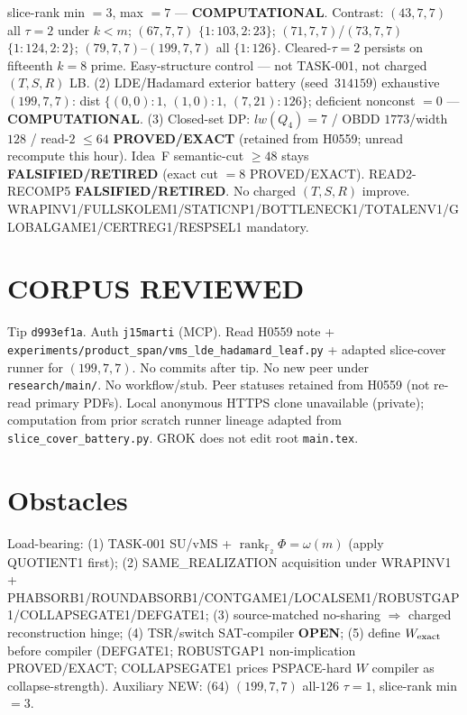 \documentclass[11pt]{article}
\begin{document}
slice-rank min $=3$, max $=7$ --- \textbf{COMPUTATIONAL}.
Contrast: $(43,7,7)$ all $\tau{=}2$ under $k{<}m$; $(67,7,7)$ $\{1{:}103,2{:}23\}$;
$(71,7,7)$/$(73,7,7)$ $\{1{:}124,2{:}2\}$; $(79,7,7)$--$(199,7,7)$ all $\{1{:}126\}$.
Cleared-$\tau{=}2$ persists on fifteenth $k{=}8$ prime. Easy-structure control --- not TASK-001,
not charged $(T,S,R)$ LB.
(2) LDE/Hadamard exterior battery (seed~$314159$) exhaustive $(199,7,7)$:
dist $\{(0,0){:}1,\,(1,0){:}1,\,(7,21){:}126\}$; deficient nonconst $=0$ --- \textbf{COMPUTATIONAL}.
(3) Closed-set DP: $lw(Q_4)=7$ / OBDD $1773$/width $128$ / read-$2$ $\le64$
\textbf{PROVED/EXACT} (retained from H0559; unread recompute this hour).
Idea~F semantic-cut $\ge48$ stays \textbf{FALSIFIED/RETIRED} (exact cut $=8$ PROVED/EXACT).
READ2-RECOMP5 \textbf{FALSIFIED/RETIRED}. No charged $(T,S,R)$ improve.
WRAPINV1/FULLSKOLEM1/STATICNP1/BOTTLENECK1/TOTALENV1/GLOBALGAME1/CERTREG1/RESPSEL1 mandatory.

\section*{CORPUS REVIEWED}
Tip \texttt{d993ef1a}. Auth \texttt{j15marti} (MCP). Read H0559 note +
\texttt{experiments/product\_span/vms\_lde\_hadamard\_leaf.py} + adapted slice-cover runner for $(199,7,7)$.
No commits after tip. No new peer under \texttt{research/main/}.
No workflow/stub. Peer statuses retained from H0559 (not re-read primary PDFs).
Local anonymous HTTPS clone unavailable (private);
computation from prior scratch runner lineage adapted from \texttt{slice\_cover\_battery.py}.
GROK does not edit root \texttt{main.tex}.

\section*{Obstacles}
Load-bearing: (1) TASK-001 SU/vMS + $\operatorname{rank}_{\mathbb F_2}\Phi=\omega(m)$ (apply QUOTIENT1 first);
(2) SAME\_REALIZATION acquisition under WRAPINV1 + PHABSORB1/ROUNDABSORB1/CONTGAME1/LOCALSEM1/ROBUSTGAP1/COLLAPSEGATE1/DEFGATE1;
(3) source-matched no-sharing $\Rightarrow$ charged reconstruction hinge;
(4) TSR/switch SAT-compiler \textbf{OPEN};
(5) define $W_{\rm exact}$ before compiler (DEFGATE1; ROBUSTGAP1 non-implication PROVED/EXACT;
COLLAPSEGATE1 prices PSPACE-hard $W$ compiler as collapse-strength).
Auxiliary NEW: (64) $(199,7,7)$ all-$126$ $\tau{=}1$, slice-rank min $=3$.
\end{document}
